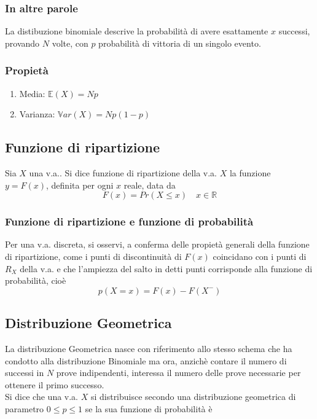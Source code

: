 \documentclass[a4paper]{report}
\begin{document}
   \subsubsection{In altre parole}
   La distibuzione binomiale descrive la probabilità di avere esattamente $x$ successi, provando $N$ volte, con $p$ probabilità di vittoria di un singolo evento.

   \subsubsection{Propietà}
   \begin{enumerate}
     \item Media: $\mathbb{E}(X) = Np$
     \item Varianza: $\mathbb{V}ar(X) = Np(1-p)$
   \end{enumerate}

   \subsection{Funzione di ripartizione}
   Sia $X$ una v.a.. Si dice funzione di ripartizione della v.a. $X$ la funzione $y=F(x)$, definita per ogni $x$ reale, data da
   \[ F(x) = Pr(X \leq x) \quad x \in \mathbb{R} \]

  \subsubsection{Funzione di ripartizione e funzione di probabilità}
  Per una v.a. discreta, si osservi, a conferma delle propietà generali della funzione di ripartizione, come i punti di discontinuità di $F(x)$ coincidano con i punti di $R_X$ della v.a. e che l'ampiezza del salto in detti punti corrisponde alla funzione di probabilità, cioè
  \[ p(X=x) = F(x) - F(X^-) \]

  \subsection{Distribuzione Geometrica}
  La distribuzione Geometrica nasce con riferimento allo stesso schema che ha condotto alla distribuzione Binomiale ma ora, anzichè contare il numero di successi in $N$ prove indipendenti, interessa il numero delle prove necessarie per ottenere il primo successo.\\

  Si dice che una v.a. $X$ si distribuisce secondo una distribuzione geometrica di parametro $0 \leq p \leq 1$ se la sua funzione di probabilità è
\end{document}
